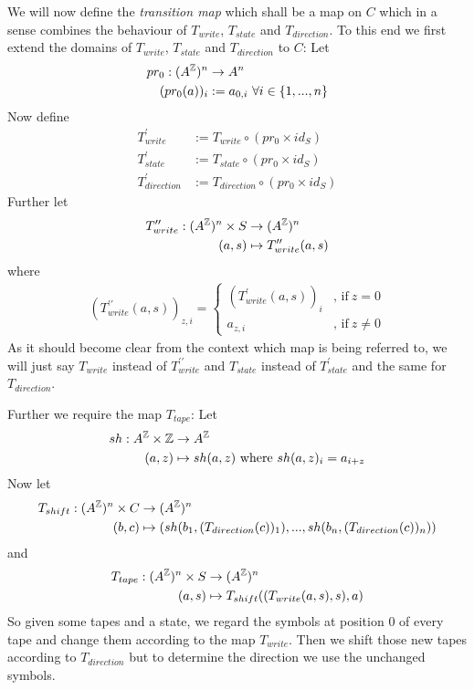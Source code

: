 We will now define the \emph{transition map} which shall be a map on $C$ which in a sense combines the behaviour of $T_{write}$, $T_{state}$ and $T_{direction}$.
To this end we first extend the domains of $T_{write}$, $T_{state}$ and $T_{direction}$ to $C$:
Let 
\begin{align*}
	pr_0: (A^{\mathbb{Z}})^n &\to A^n \\
	 (pr_0(a))_i &:= a_{0,i}~\forall i \in \{1,...,n\}
\end{align*}
Now define
\begin{align*}
	T_{write}^\prime &:= T_{write} \circ (pr_0 \times id_S) \\
	T_{state}^\prime &:= T_{state} \circ (pr_0 \times id_S) \\
	T_{direction}^\prime &:= T_{direction} \circ (pr_0 \times id_S)
\end{align*}
Further let
\begin{align*}
	T_{write}^{\prime\prime}: (A^{\mathbb{Z}})^n \times S &\to (A^{\mathbb{Z}})^n \\
	(a,s) &\mapsto T_{write}^{\prime\prime}(a,s) \\
\end{align*}
where
\begin{align*}
	(T_{write}^{\prime\prime}(a,s))_{z,i} =
	\begin{cases}
		(T_{write}^\prime(a,s))_i &\text{, if}~z = 0 \\
		a_{z,i} &\text{, if}~z \neq 0
	\end{cases}
\end{align*}
As it should become clear from the context which map is being referred to, we will just say $T_{write}$ instead of $T_{write}^{\prime\prime}$
and $T_{state}$ instead of $T_{state}^{\prime}$
and the same for $T_{direction}$.

Further we require the map $T_{tape}$:
Let
\begin{align*}
	sh: A^{\mathbb{Z}} \times \mathbb{Z} &\to A^{\mathbb{Z}} \\
	(a,z) &\mapsto sh(a,z)~\text{where}~sh(a,z)_i = a_{i+z}
\end{align*}
Now let
\begin{align*}
	T_{shift}: (A^{\mathbb{Z}})^n \times C &\to (A^{\mathbb{Z}})^n \\
	(b,c) &\mapsto ( sh(b_1,(T_{direction}(c))_1) , ... , sh(b_n,(T_{direction}(c))_n) )
\end{align*}
and
\begin{align*}
	T_{tape}: (A^{\mathbb{Z}})^n \times S &\to (A^{\mathbb{Z}})^n \\
	(a,s) &\mapsto T_{shift} ((T_{write} (a,s) , s) , a)
\end{align*}
So given some tapes and a state, we regard the symbols at position 0 of every tape and change them according to the map $T_{write}$.
Then we shift those new tapes according to $T_{direction}$ but to determine the direction we use the unchanged symbols.

